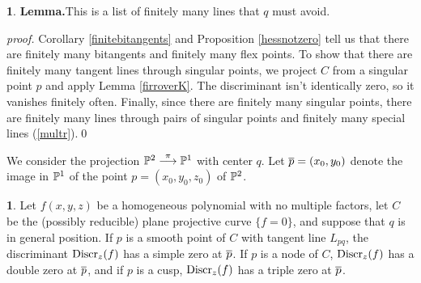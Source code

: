 \documentclass[leqno]{book}
\newcommand\Marginnote[1]{\marginnote{\hspace{-12pt}\normalfont{#1}}}
\theoremstyle{definition}%
\numberwithin{equation}{section}
\theoremstyle{theorem} %
\newtheorem{lemma}[equation]{}
\newtheorem{proposition}[equation]{}
\renewenvironment{proof}{\no \emph{proof.}}{}
\begin{document}
\begin{lemma}{\bf Lemma.}\label{finlines}
 This is a list of finitely many
lines that $q$ must avoid. \end{lemma}

\begin{proof} 
Corollary \ref{finitebitangents} and Proposition \ref{hessnotzero}
tell us that there are finitely many bitangents and finitely many flex
points.  To show that there are finitely many tangent lines through
singular points, we project $C$ from a singular point $p$ and apply
Lemma \ref{firroverK}.  The discriminant isn't identically zero, so it
vanishes finitely often.  Finally, since there are finitely many
singular points, there are finitely many lines through pairs of
singular points and finitely many special lines
(\ref{multr}).\qed\end{proof}

We consider the projection $\mathbb{P}^2 \stackrel\pi\longrightarrow \mathbb{P}^1$
with center $q$.  Let $\overline p = (x_0,y_0)$ denote the image in $\mathbb{P}^1$
of the point $p= (x_0,y_0,z_0)$ of $\mathbb{P}^2$.

\begin{proposition}{}
\Marginnote{discrimvanishing}\label{discrimvanishing} Let $f(x,y,z)$
be a homogeneous polynomial with no multiple factors, let $C$ be the
(possibly reducible) plane projective curve $\{f = 0\}$, and suppose
that  $q$ is in general position. If $p$ is a smooth point of $C$ with
tangent line $L_{pq}$, the discriminant $\operatorname{Discr}_z(f)$ has a simple
zero at $\overline p$.  If $p$ is a node of $C$, $\operatorname{Discr}_z(f)$ has a double
zero at $\overline p$, and if $p$ is a cusp, $\operatorname{Discr}_z(f)$ has a triple
zero at $\overline p$.
\end{proposition}
\end{document}
